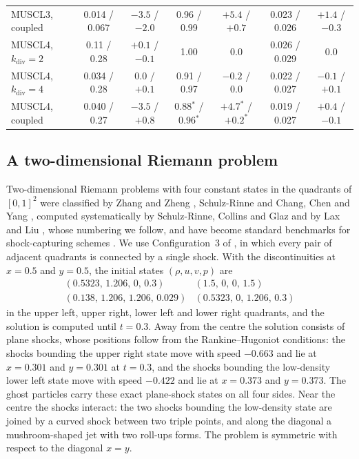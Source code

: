 \documentclass[11pt,a4paper]{article}
\numberwithin{equation}{section}
\begin{document}
\begin{table}[!htbp]
\begin{tabular}{@{}lcccccc@{}}
MUSCL3, coupled & 0.014 / 0.067 & $-3.5$ / $-2.0$ & 0.96 / 0.99 & $+5.4$ / $+0.7$ & 0.023 / 0.026 & $+1.4$ / $-0.3$\\
MUSCL4, $k_{\mathrm{div}}=2$ & 0.11 / 0.28 & $+0.1$ / $-0.1$ & 1.00 & $0.0$ & 0.026 / 0.029 & $0.0$\\
MUSCL4, $k_{\mathrm{div}}=4$ & 0.034 / 0.28 & $0.0$ / $+0.1$ & 0.91 / 0.97 & $-0.2$ / $0.0$ & 0.022 / 0.027 & $-0.1$ / $+0.1$\\
MUSCL4, coupled & 0.040 / 0.27 & $-3.5$ / $+0.8$ & 0.88$^*$ / 0.96$^*$ & $+4.7^*$ / $+0.2^*$ & 0.019 / 0.027 & $+0.4$ / $-0.1$\\
\bottomrule
\end{tabular}
\end{table}

\subsection{A two-dimensional Riemann problem}\label{sec:riemann}

Two-dimensional Riemann problems with four constant states in the quadrants of $[0,1]^2$ were classified by Zhang and Zheng \cite{ZhangZheng1990}, Schulz-Rinne \cite{SchulzRinne1993class} and Chang, Chen and Yang \cite{ChangChenYang1995,ChangChenYang2000}, computed systematically by Schulz-Rinne, Collins and Glaz \cite{SchulzRinne1993} and by Lax and Liu \cite{LaxLiu1998}, whose numbering we follow, and have become standard benchmarks for shock-capturing schemes \cite{KurganovTadmor2002}. We use Configuration~3 of \cite{LaxLiu1998,KurganovTadmor2002}, in which every pair of adjacent quadrants is connected by a single shock. With the discontinuities at $x=0.5$ and $y=0.5$, the initial states $(\rho,u,v,p)$ are
\[
\begin{array}{ll}
(0.5323,\,1.206,\,0,\,0.3) & (1.5,\,0,\,0,\,1.5)\\
(0.138,\,1.206,\,1.206,\,0.029) & (0.5323,\,0,\,1.206,\,0.3)
\end{array}
\]
in the upper left, upper right, lower left and lower right quadrants, and the solution is computed until $t=0.3$. Away from the centre the solution consists of plane shocks, whose positions follow from the Rankine--Hugoniot conditions: the shocks bounding the upper right state move with speed $-0.663$ and lie at $x=0.301$ and $y=0.301$ at $t=0.3$, and the shocks bounding the low-density lower left state move with speed $-0.422$ and lie at $x=0.373$ and $y=0.373$. The ghost particles carry these exact plane-shock states on all four sides. Near the centre the shocks interact: the two shocks bounding the low-density state are joined by a curved shock between two triple points, and along the diagonal a mushroom-shaped jet with two roll-ups forms. The problem is symmetric with respect to the diagonal $x=y$.
\end{document}
